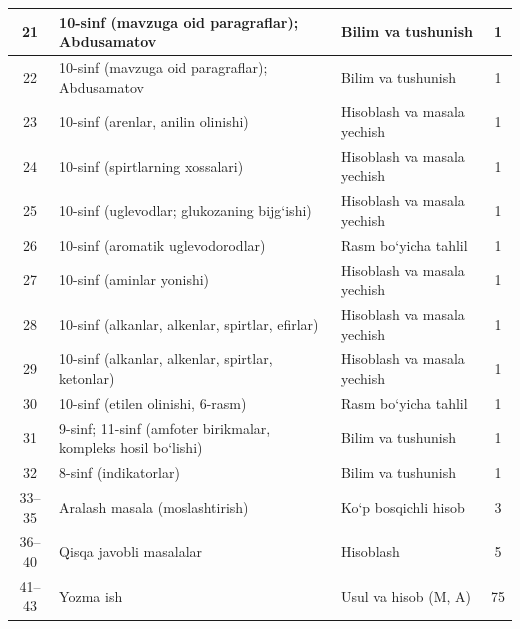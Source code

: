 \documentclass[11pt,a4paper]{article}
\begin{document}
{\begin{longtable}{|c|p{7.2cm}|p{5.4cm}|c|}
21 & 10-sinf (mavzuga oid paragraflar); Abdusamatov & Bilim va tushunish & 1\\\hline
22 & 10-sinf (mavzuga oid paragraflar); Abdusamatov & Bilim va tushunish & 1\\\hline
23 & 10-sinf (arenlar, anilin olinishi) & Hisoblash va masala yechish & 1\\\hline
24 & 10-sinf (spirtlarning xossalari) & Hisoblash va masala yechish & 1\\\hline
25 & 10-sinf (uglevodlar; glukozaning bijg`ishi) & Hisoblash va masala yechish & 1\\\hline
26 & 10-sinf (aromatik uglevodorodlar) & Rasm bo`yicha tahlil & 1\\\hline
27 & 10-sinf (aminlar yonishi) & Hisoblash va masala yechish & 1\\\hline
28 & 10-sinf (alkanlar, alkenlar, spirtlar, efirlar) & Hisoblash va masala yechish & 1\\\hline
29 & 10-sinf (alkanlar, alkenlar, spirtlar, ketonlar) & Hisoblash va masala yechish & 1\\\hline
30 & 10-sinf (etilen olinishi, 6-rasm) & Rasm bo`yicha tahlil & 1\\\hline
31 & 9-sinf; 11-sinf (amfoter birikmalar, kompleks hosil bo`lishi) & Bilim va tushunish & 1\\\hline
32 & 8-sinf (indikatorlar) & Bilim va tushunish & 1\\\hline
33--35 & Aralash masala (moslashtirish) & Ko`p bosqichli hisob & 3\\\hline
36--40 & Qisqa javobli masalalar & Hisoblash & 5\\\hline
41--43 & Yozma ish & Usul va hisob (M, A) & 75\\\hline
\end{longtable}}
\end{document}
